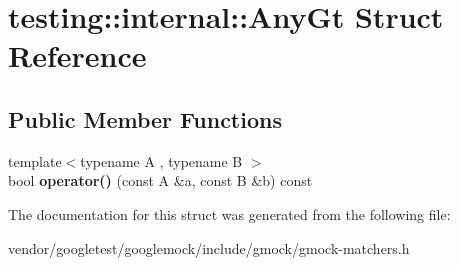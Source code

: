 \hypertarget{structtesting_1_1internal_1_1AnyGt}{}\section{testing\+:\+:internal\+:\+:Any\+Gt Struct Reference}
\label{structtesting_1_1internal_1_1AnyGt}
\subsection*{Public Member Functions}
\begin{DoxyCompactItemize}
\item 
{\footnotesize template$<$typename A , typename B $>$ }\\bool {\bfseries operator()} (const A \&a, const B \&b) const \hypertarget{structtesting_1_1internal_1_1AnyGt_a5b4630e761b2975c97701fc51c018d07}{}\label{structtesting_1_1internal_1_1AnyGt_a5b4630e761b2975c97701fc51c018d07}

\end{DoxyCompactItemize}


The documentation for this struct was generated from the following file\+:\begin{DoxyCompactItemize}
\item 
vendor/googletest/googlemock/include/gmock/gmock-\/matchers.\+h\end{DoxyCompactItemize}
